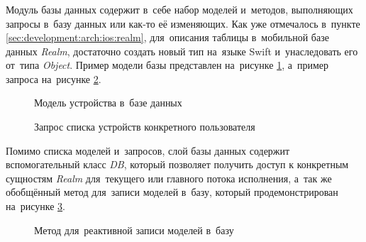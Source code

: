 \subsubsection{}
\label{sec:development:client:db}

Модуль базы данных содержит в~себе набор моделей и~методов, выполняющих запросы в~базу данных или как-то её изменяющих. 
Как уже отмечалось в~пункте \ref{sec:development:arch:ios:realm}, для~описания таблицы в~мобильной базе данных \textit{Realm}, достаточно создать новый тип на~языке Swift и~унаследовать его от~типа \textit{Object}. Пример модели базы представлен на~рисунке \ref{sec:development:client:db:code:model}, а~пример запроса на~рисунке \ref{sec:development:client:db:code:query}.

\begin{figure}[h]
	
   \caption{Модель устройства в~базе данных}
   \label{sec:development:client:db:code:model}
\end{figure}

\begin{figure}[h]
	
   \caption{Запрос списка устройств конкретного пользователя}
   \label{sec:development:client:db:code:query}
\end{figure}

Помимо списка моделей и~запросов, слой базы данных содержит вспомогательный класс \textit{DB}, который позволяет получить доступ к конкретным сущностям \textit{Realm} для~текущего или главного потока исполнения, а~так же обобщённый метод для~записи моделей в~базу, который продемонстрирован на~рисунке \ref{sec:development:client:db:code:util}.

\begin{figure}[h]
	
   \caption{Метод для~реактивной записи моделей в~базу}
   \label{sec:development:client:db:code:util}
\end{figure}